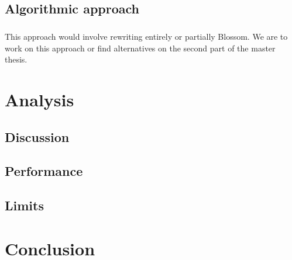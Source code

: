 \documentclass[12pt]{report}
\theoremstyle{definition}
\theoremstyle{definition}
\theoremstyle{definition}
\begin{document}
\section{Algorithmic approach}
\paragraph{} This approach would involve rewriting entirely or partially Blossom. We are to work on this
approach or find alternatives on the second part of the master thesis.


\chapter{Analysis}
\section{Discussion}
\section{Performance}
\section{Limits}


\chapter*{Conclusion}


\nocite{*}


\end{document}
